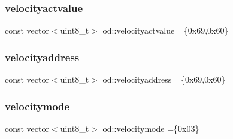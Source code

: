 \subsubsection{\texorpdfstring{velocityactvalue}{velocityactvalue}}
{\footnotesize\ttfamily const vector$<$uint8\+\_\+t$>$ od\+::velocityactvalue =\{0x69,0x60\}}

\mbox{\label{namespaceod_adf45781fb80275c184d548ea793b376b}} 
\subsubsection{\texorpdfstring{velocityaddress}{velocityaddress}}
{\footnotesize\ttfamily const vector$<$uint8\+\_\+t$>$ od\+::velocityaddress =\{0x69,0x60\}}

\mbox{\label{namespaceod_a2771fb30adf397c1cd2ddb092a414e82}} 
\subsubsection{\texorpdfstring{velocitymode}{velocitymode}}
{\footnotesize\ttfamily const vector$<$uint8\+\_\+t$>$ od\+::velocitymode =\{0x03\}}

